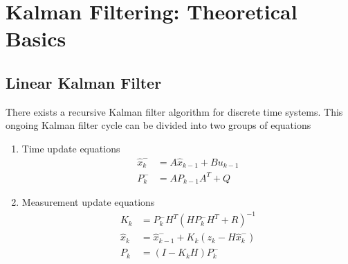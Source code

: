 \chapter{Kalman Filtering: Theoretical Basics}

\section{Linear Kalman Filter}
There exists a recursive Kalman filter algorithm for discrete time systems.\cite{IntroKF} This ongoing Kalman filter cycle can be divided into two groups of equations
\newline
\begin{enumerate}
	\item Time update equations
	\begin{eqnarray}\label{TupEq}
    			\hat{x}_{k}^{-} &= A\hat{x}_{k-1}+Bu_{k-1} \\
    			P_{k}^{-} &= AP_{k-1}A^{T}+Q
	\end{eqnarray}
	\item Measurement update equations
	\begin{eqnarray}\label{MupEq}
    			K_{k} &= P_{k}^{-}H^{T}(HP_{k}^{-}H^{T}+R)^{-1} \\
    			\hat{x}_{k} &= \hat{x}_{k-1}^{-}+K_{k}(z_{k}-H\hat{x}_{k}^{-}) \\
			P_{k} &= (I-K_{k}H)P_{k}^{-}
	\end{eqnarray}
\end{enumerate}


